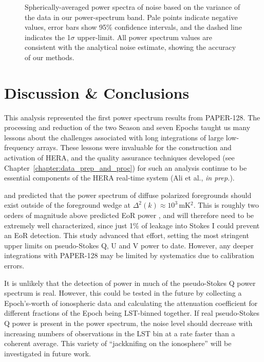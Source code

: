 \begin{figure}
\begin{tabular}{ll}
\end{tabular}
\caption[Spherically-averaged noise power spectra.]{Spherically-averaged power spectra of noise based on the variance of the data in our power-spectrum band. Pale points indicate negative values, error bars show 95\% confidence intervals, and the dashed line indicates the 1$\sigma$ upper-limit. All power spectrum values are consistent with the analytical noise estimate, showing the accuracy of our methods.}
\label{fig:psa128_power_spectra_noise}
\end{figure}

\section{Discussion \& Conclusions}
\label{sec:psa128_conc}

This analysis represented the first power spectrum results from PAPER-128. The processing and reduction of the two Season and seven Epochs taught us many lessons about the challenges associated with long integrations of large low-frequency arrays. These lessons were invaluable for the construction and activation of HERA, and the quality assurance techniques developed (see Chapter~\ref{chapter:data_prep_and_proc}) for such an analysis continue to be essential components of the HERA real-time system (Ali et al., \textit{in prep.}).

\cite{Nunhokee.17} and \cite{Asad.15} predicted that the power spectrum of diffuse polarized foregrounds should exist outside of the foreground wedge at $\Delta^2(k)\approx10^3$\,mK$^2$. This is roughly two orders of magnitude above predicted EoR power \citep{Lidz.07}, and will therefore need to be extremely well characterized, since just 1\% of leakage into Stokes I could prevent an EoR detection. This study advanced that effort, setting the most stringent upper limits on pseudo-Stokes Q, U and V power to date. However, any deeper integrations with PAPER-128 may be limited by systematics due to calibration errors. 

It is unlikely that the detection of power in much of the pseudo-Stokes Q power spectrum is real. However, this could be tested in the future by collecting a Epoch's-worth of ionospheric data and calculating the attenuation coefficient for different fractions of the Epoch being LST-binned together. If real pseudo-Stokes Q power is present in the power spectrum, the noise level should decrease with increasing numbers of observations in the LST bin at a rate faster than a coherent average. This variety of ``jackknifing on the ionosphere'' will be investigated in future work.\\\\

